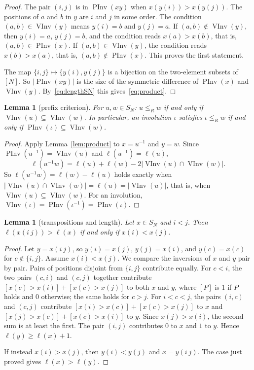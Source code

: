 \documentclass[11pt]{amsart}
\newtheorem{lemma}[theorem]{Lemma}
\theoremstyle{definition}
\theoremstyle{remark}
\numberwithin{equation}{section}
\newcommand{\leR}{\le_R}
\newcommand{\abs}[1]{\lvert #1\rvert}
\DeclareMathOperator{\PInv}{PInv}
\DeclareMathOperator{\VInv}{VInv}
\begin{document}
\begin{proof}
The pair \((i,j)\) is in \(\PInv(xy)\) when \(x(y(i))>x(y(j))\). The positions of \(a\) and \(b\) in \(y\) are \(i\) and \(j\) in some order. The condition \((a,b)\in\VInv(y)\) means \(y(i)=b\) and \(y(j)=a\). If \((a,b)\notin\VInv(y)\), then \(y(i)=a\), \(y(j)=b\), and the condition reads \(x(a)>x(b)\), that is, \((a,b)\in\PInv(x)\). If \((a,b)\in\VInv(y)\), the condition reads \(x(b)>x(a)\), that is, \((a,b)\notin\PInv(x)\). This proves the first statement.

The map \(\{i,j\}\mapsto\{y(i),y(j)\}\) is a bijection on the two-element subsets of \([N]\). So \(\abs{\PInv(xy)}\) is the size of the symmetric difference of \(\PInv(x)\) and \(\VInv(y)\). By~\eqref{eq:lengthSN} this gives~\eqref{eq:product}.
\end{proof}

\begin{lemma}[prefix criterion]\label{lem:prefixcrit}
For \(u,w\in S_N\): \(u\leR w\) if and only if \(\VInv(u)\subseteq\VInv(w)\). In particular, an involution \(\iota\) satisfies \(\iota\leR w\) if and only if \(\PInv(\iota)\subseteq\VInv(w)\).
\end{lemma}

\begin{proof}
Apply Lemma~\ref{lem:product} to \(x=u^{-1}\) and \(y=w\). Since \(\PInv(u^{-1})=\VInv(u)\) and \(\ell(u^{-1})=\ell(u)\),
\[
\ell(u^{-1}w)=\ell(u)+\ell(w)-2\abs{\VInv(u)\cap\VInv(w)}.
\]
So \(\ell(u^{-1}w)=\ell(w)-\ell(u)\) holds exactly when \(\abs{\VInv(u)\cap\VInv(w)}=\ell(u)=\abs{\VInv(u)}\), that is, when \(\VInv(u)\subseteq\VInv(w)\). For an involution, \(\VInv(\iota)=\PInv(\iota^{-1})=\PInv(\iota)\).
\end{proof}

\begin{lemma}[transpositions and length]\label{lem:transp}
Let \(x\in S_N\) and \(i<j\). Then \(\ell(x(i\ j))>\ell(x)\) if and only if \(x(i)<x(j)\).
\end{lemma}

\begin{proof}
Let \(y=x(i\ j)\), so \(y(i)=x(j)\), \(y(j)=x(i)\), and \(y(c)=x(c)\) for \(c\notin\{i,j\}\). Assume \(x(i)<x(j)\). We compare the inversions of \(x\) and \(y\) pair by pair. Pairs of positions disjoint from \(\{i,j\}\) contribute equally. For \(c<i\), the two pairs \((c,i)\) and \((c,j)\) together contribute \([x(c)>x(i)]+[x(c)>x(j)]\) to both \(x\) and \(y\), where \([P]\) is \(1\) if \(P\) holds and \(0\) otherwise; the same holds for \(c>j\). For \(i<c<j\), the pairs \((i,c)\) and \((c,j)\) contribute \([x(i)>x(c)]+[x(c)>x(j)]\) to \(x\) and \([x(j)>x(c)]+[x(c)>x(i)]\) to \(y\). Since \(x(j)>x(i)\), the second sum is at least the first. The pair \((i,j)\) contributes \(0\) to \(x\) and \(1\) to \(y\). Hence \(\ell(y)\ge\ell(x)+1\).

If instead \(x(i)>x(j)\), then \(y(i)<y(j)\) and \(x=y(i\ j)\). The case just proved gives \(\ell(x)>\ell(y)\).
\end{proof}
\end{document}
